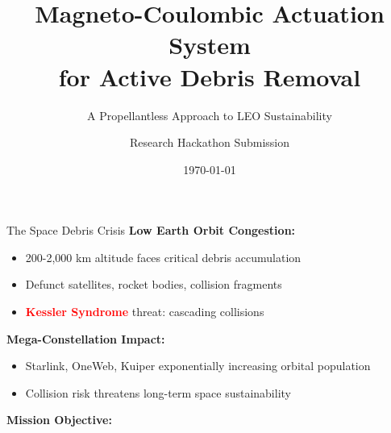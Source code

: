 \documentclass[aspectratio=169]{beamer}
\title{Magneto-Coulombic Actuation System \\ for Active Debris Removal}
\subtitle{A Propellantless Approach to LEO Sustainability}
\author{Research Hackathon Submission}
\institute{IIT Kanpur - Institute Research Symposium 2025}
\date{\today}
\begin{document}
\frame{\titlepage}

\begin{frame}{The Space Debris Crisis}
\textbf{Low Earth Orbit Congestion:}
\begin{itemize}
    \item 200-2,000 km altitude faces critical debris accumulation
    \item Defunct satellites, rocket bodies, collision fragments
    \item \textcolor{red}{\textbf{Kessler Syndrome}} threat: cascading collisions
\end{itemize}

\vspace{0.3cm}
\textbf{Mega-Constellation Impact:}
\begin{itemize}
    \item Starlink, OneWeb, Kuiper exponentially increasing orbital population
    \item Collision risk threatens long-term space sustainability
\end{itemize}

\vspace{0.3cm}
\textbf{Mission Objective:}
\begin{center}
\end{center}
\end{frame}
\end{document}
